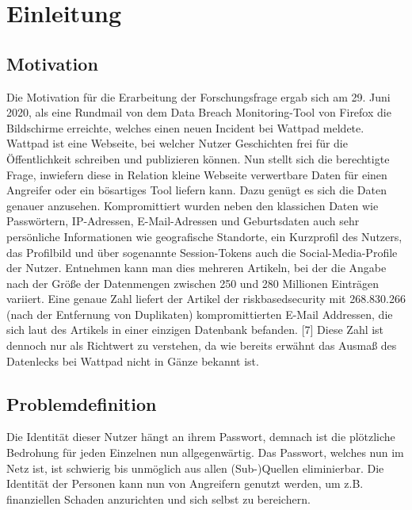 \chapter{Einleitung}

\section{Motivation}
Die Motivation für die Erarbeitung der Forschungsfrage ergab sich am 29. Juni 2020, als eine Rundmail von dem Data Breach Monitoring-Tool von Firefox die Bildschirme erreichte, welches einen neuen Incident bei Wattpad meldete. Wattpad ist eine Webseite, bei welcher Nutzer Geschichten frei für die Öffentlichkeit schreiben und publizieren können. Nun stellt sich die berechtigte Frage, inwiefern diese in Relation kleine Webseite verwertbare Daten für einen Angreifer oder ein bösartiges Tool liefern kann. Dazu genügt es sich die Daten genauer anzusehen. Kompromittiert wurden neben den klassichen Daten wie Passwörtern, IP-Adressen, E-Mail-Adressen und Geburtsdaten auch sehr persönliche Informationen wie geografische Standorte, ein Kurzprofil des Nutzers, das Profilbild und über sogenannte Session-Tokens auch die Social-Media-Profile der Nutzer. Entnehmen kann man dies mehreren Artikeln, bei der die Angabe nach der Größe der Datenmengen zwischen 250 und 280 Millionen Einträgen variiert. Eine genaue Zahl liefert der Artikel der riskbasedsecurity mit 268.830.266 (nach der Entfernung von Duplikaten) kompromittierten E-Mail Addressen, die sich laut des Artikels in einer einzigen Datenbank befanden. [7] Diese Zahl ist dennoch nur als Richtwert zu verstehen, da wie bereits erwähnt das Ausmaß des Datenlecks bei Wattpad nicht in Gänze bekannt ist.

\section{Problemdefinition}
Die Identität dieser Nutzer hängt an ihrem Passwort, demnach ist die plötzliche Bedrohung für jeden Einzelnen nun allgegenwärtig. Das Passwort, welches nun im Netz ist, ist schwierig bis unmöglich aus allen (Sub-)Quellen eliminierbar. Die Identität der Personen kann nun von Angreifern genutzt werden, um z.B. finanziellen Schaden anzurichten und sich selbst zu bereichern.
\newpage

